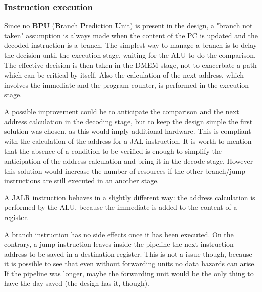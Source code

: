 \documentclass[a4paper]{article}
\begin{document}
\subsubsection{Instruction execution}
Since no \textbf{BPU} (\textbf{B}ranch \textbf{P}rediction \textbf{U}nit) is present in the design, a "branch not taken" assumption is always made when the content of the PC is updated and the decoded instruction is a branch. The simplest way to manage a branch is to delay the decision until the execution stage, waiting for the ALU to do the comparison. The effective decision is then taken in the DMEM stage, not to exacerbate a path which can be critical by itself. 
Also the calculation of the next address, which involves the immediate and the program counter, is performed in the execution stage.

A possible improvement could be to anticipate the comparison and the next address calculation in the decoding stage, but to keep the design simple the first solution was chosen, as this would imply additional hardware.
This is compliant with the calculation of the address for a JAL instruction. It is worth to mention that the absence of a condition to be verified is enough to simplify the anticipation of the address calculation and bring it in the decode stage. However this solution would increase the number of resources if the other branch/jump instructions are still executed in an another stage.

A JALR instruction behaves in a slightly different way: the address calculation is performed by the ALU, because the immediate is added to the content of a register.

A branch instruction has no side effects once it has been executed. On the contrary, a jump instruction leaves inside the pipeline the next instruction address to be saved in a destination register. This is not a issue though, because it is possible to see that even without forwarding units no data hazards can arise. If the pipeline was longer, maybe the forwarding unit would be the only thing to have the day saved (the design has it, though).
\end{document}
